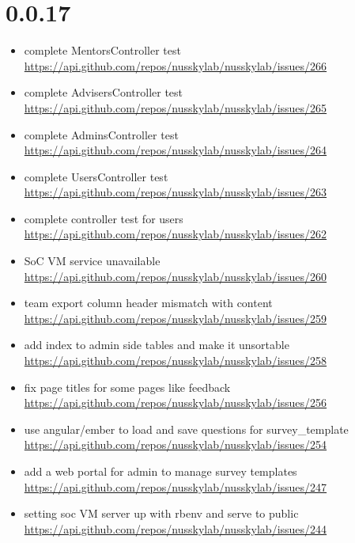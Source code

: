 {\section{0.0.17}
\begin{itemize}[noitemsep]
    \item complete MentorsController test \url{https://api.github.com/repos/nusskylab/nusskylab/issues/266} 
    \item complete AdvisersController test \url{https://api.github.com/repos/nusskylab/nusskylab/issues/265} 
    \item complete AdminsController test \url{https://api.github.com/repos/nusskylab/nusskylab/issues/264} 
    \item complete UsersController test \url{https://api.github.com/repos/nusskylab/nusskylab/issues/263} 
    \item complete controller test for users \url{https://api.github.com/repos/nusskylab/nusskylab/issues/262} 
    \item SoC VM service unavailable \url{https://api.github.com/repos/nusskylab/nusskylab/issues/260} 
    \item team export column header mismatch with content \url{https://api.github.com/repos/nusskylab/nusskylab/issues/259} 
    \item add index to admin side tables and make it unsortable \url{https://api.github.com/repos/nusskylab/nusskylab/issues/258} 
    \item fix page titles for some pages like feedback \url{https://api.github.com/repos/nusskylab/nusskylab/issues/256} 
    \item use angular/ember to load and save questions for survey\_template \url{https://api.github.com/repos/nusskylab/nusskylab/issues/254} 
    \item add a web portal for admin to manage survey templates \url{https://api.github.com/repos/nusskylab/nusskylab/issues/247} 
    \item setting soc VM server up with rbenv and serve to public \url{https://api.github.com/repos/nusskylab/nusskylab/issues/244} 
\end{itemize}

}
